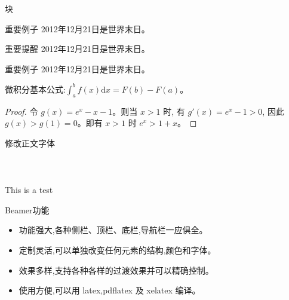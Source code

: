 \begin{frame}{块}
    \begin{block}{重要例子}
    2012年12月21日是世界末日。
    \end{block}

    \begin{alertblock}{重要提醒}
    2012年12月21日是世界末日。
    \end{alertblock}

    \begin{exampleblock}{重要例子}
    2012年12月21日是世界末日。
    \end{exampleblock}

    \begin{theorem}
    微积分基本公式:$\int_a^b f(x)\mathrm{d}x=F(b)-F(a)$。
    \end{theorem}

    \begin{proof}
    令 $g(x)=e^x-x-1$。则当 $x>1$ 时, 有 $g'(x)=e^x-1>0$,
    因此 $g(x)>g(1)=0$。即有 $x>1$ 时 $e^x>1+x$。
    \end{proof}
\end{frame}


\begin{frame}{修改正文字体}
~\\
~\\
~\\
~\\
This is a test
\end{frame}

\begin{frame}{Beamer功能}
\begin{itemize}
    \item 功能强大,各种侧栏、顶栏、底栏,导航栏一应俱全。
    \item 定制灵活,可以单独改变任何元素的结构,颜色和字体。
    \item 效果多样,支持各种各样的过渡效果并可以精确控制。
    \item 使用方便,可以用 latex,pdflatex 及 xelatex 编译。
\end{itemize}
\end{frame}


